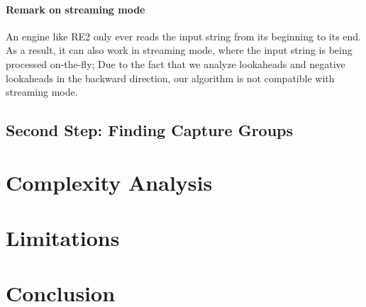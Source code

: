 \documentclass{article}
\begin{document}
\paragraph{Remark on streaming mode}
An engine like RE2 only ever reads the input string from its beginning to its end.
As a result, it can also work in streaming mode, where the input string is being processed on-the-fly;
Due to the fact that we analyze lookaheads and negative lookaheads in the backward direction, our algorithm is not compatible with streaming mode.




\subsection{Second Step: Finding Capture Groups}

\section{Complexity Analysis}

\section{Limitations}

\section{Conclusion}



\newpage

\end{document}
